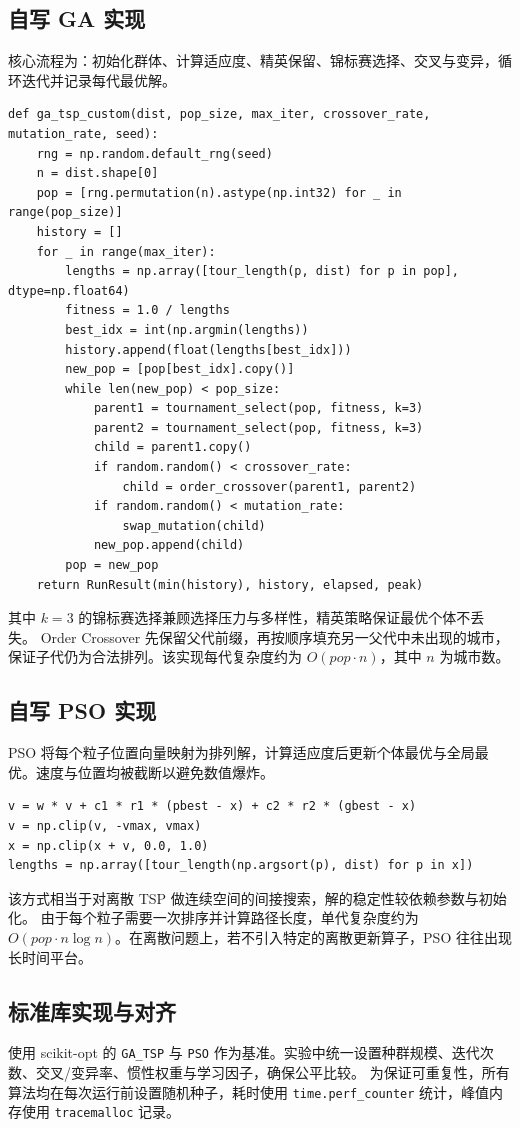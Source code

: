 \documentclass[runningheads]{ctexart}
\begin{document}
\subsection{自写 GA 实现}
核心流程为：初始化群体、计算适应度、精英保留、锦标赛选择、交叉与变异，循环迭代并记录每代最优解。
\begin{lstlisting}
def ga_tsp_custom(dist, pop_size, max_iter, crossover_rate, mutation_rate, seed):
	rng = np.random.default_rng(seed)
	n = dist.shape[0]
	pop = [rng.permutation(n).astype(np.int32) for _ in range(pop_size)]
	history = []
	for _ in range(max_iter):
		lengths = np.array([tour_length(p, dist) for p in pop], dtype=np.float64)
		fitness = 1.0 / lengths
		best_idx = int(np.argmin(lengths))
		history.append(float(lengths[best_idx]))
		new_pop = [pop[best_idx].copy()]
		while len(new_pop) < pop_size:
			parent1 = tournament_select(pop, fitness, k=3)
			parent2 = tournament_select(pop, fitness, k=3)
			child = parent1.copy()
			if random.random() < crossover_rate:
				child = order_crossover(parent1, parent2)
			if random.random() < mutation_rate:
				swap_mutation(child)
			new_pop.append(child)
		pop = new_pop
	return RunResult(min(history), history, elapsed, peak)
\end{lstlisting}
其中 $k=3$ 的锦标赛选择兼顾选择压力与多样性，精英策略保证最优个体不丢失。
Order Crossover 先保留父代前缀，再按顺序填充另一父代中未出现的城市，保证子代仍为合法排列。该实现每代复杂度约为 $O(pop \cdot n)$，其中 $n$ 为城市数。

\subsection{自写 PSO 实现}
PSO 将每个粒子位置向量映射为排列解，计算适应度后更新个体最优与全局最优。速度与位置均被截断以避免数值爆炸。
\begin{lstlisting}
v = w * v + c1 * r1 * (pbest - x) + c2 * r2 * (gbest - x)
v = np.clip(v, -vmax, vmax)
x = np.clip(x + v, 0.0, 1.0)
lengths = np.array([tour_length(np.argsort(p), dist) for p in x])
\end{lstlisting}
该方式相当于对离散 TSP 做连续空间的间接搜索，解的稳定性较依赖参数与初始化。
由于每个粒子需要一次排序并计算路径长度，单代复杂度约为 $O(pop \cdot n \log n)$。在离散问题上，若不引入特定的离散更新算子，PSO 往往出现长时间平台。

\subsection{标准库实现与对齐}
使用 scikit-opt 的 \texttt{GA\_TSP} 与 \texttt{PSO} 作为基准。实验中统一设置种群规模、迭代次数、交叉/变异率、惯性权重与学习因子，确保公平比较。
为保证可重复性，所有算法均在每次运行前设置随机种子，耗时使用 \texttt{time.perf\_counter} 统计，峰值内存使用 \texttt{tracemalloc} 记录。
\end{document}
